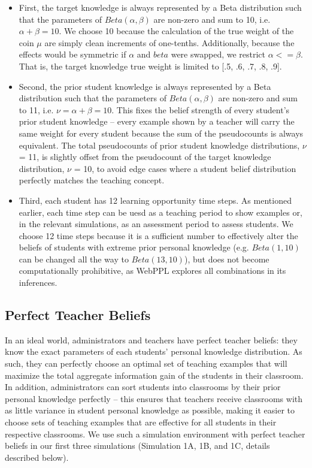 \documentclass[10pt, letterpaper]{article}
\begin{document}
\begin{itemize}
\item
  First, the target knowledge is always represented by a Beta
  distribution such that the parameters of \(Beta(\alpha,\beta)\) are
  non-zero and sum to 10, i.e. \(\alpha + \beta = 10\). We choose 10
  because the calculation of the true weight of the coin \(\mu\) are
  simply clean increments of one-tenths. Additionally, because the
  effects would be symmetric if \(\alpha\) and \(beta\) were swapped, we
  restrict \(\alpha <= \beta\). That is, the target knowledge true
  weight is limited to {[}.5, .6, .7, .8, .9{]}.
\item
  Second, the prior student knowledge is always represented by a Beta
  distribution such that the parameters of \(Beta(\alpha,\beta)\) are
  non-zero and sum to 11, i.e. \(\nu = \alpha + \beta = 10\). This fixes
  the belief strength of every student's prior student knowledge --
  every example shown by a teacher will carry the same weight for every
  student because the sum of the pseudocounts is always equivalent. The
  total pseudocounts of prior student knowledge distributions, \(\nu\) =
  11, is slightly offset from the pseudocount of the target knowledge
  distribution, \(\nu\) = 10, to avoid edge cases where a student belief
  distribution perfectly matches the teaching concept.
\item
  Third, each student has 12 learning opportunity time steps. As
  mentioned earlier, each time step can be uesd as a teaching period to
  show examples or, in the relevant simulations, as an assessment period
  to assess students. We choose 12 time steps because it is a sufficient
  number to effectively alter the beliefs of students with extreme prior
  personal knowledge (e.g. \(Beta(1,10)\) can be changed all the way to
  \(Beta(13,10)\)), but does not become computationally prohibitive, as
  WebPPL explores all combinations in its inferences. 
\end{itemize}

\subsection{Perfect Teacher Beliefs}\label{perfect-teacher-beliefs}

In an ideal world, administrators and teachers have perfect teacher
beliefs: they know the exact parameters of each students' personal
knowledge distribution. As such, they can perfectly choose an optimal
set of teaching examples that will maximize the total aggregate
information gain of the students in their classroom. In addition,
administrators can sort students into classrooms by their prior personal
knowledge perfectly -- this ensures that teachers receive classrooms
with as little variance in student personal knowledge as possible,
making it easier to choose sets of teaching examples that are effective
for all students in their respective classrooms. We use such a
simulation environment with perfect teacher beliefs in our first three
simulations (Simulation 1A, 1B, and 1C, details described below).
\end{document}
